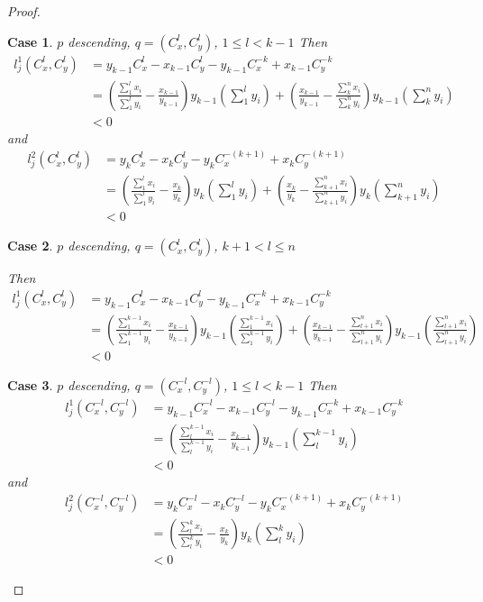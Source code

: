 \documentclass{article}
\theoremstyle{case}
\newtheorem{case}{Case}
\begin{document}
\begin{proof}
%
%
\setcounter{case}{0}
\begin{case} $p$ descending, $q = \left( C_x^l, C_y^l\right)$, $1 \leq l < k-1$
\noindent Then
\begin{align*}
l_j^1\left( C_x^l, C_y^l \right) &= y_{k-1}C_x^l - x_{k-1}C_y^l - y_{k-1}C_x^{-k} + x_{k-1}C_y^{-k} \\
&= \left( \frac{\sum_1^l x_i}{\sum_1^l y_i} - \frac{x_{k-1}}{y_{k-1}}\right)y_{k-1}\left( \sum_1^l y_i\right) + \left( \frac{x_{k-1}}{y_{k-1}} - \frac{\sum_k^n x_i}{\sum_k^n y_i}\right)y_{k-1}\left( \sum_k^n y_i\right) \\
&< 0
\end{align*}
and
\begin{align*}
l_j^2\left( C_x^l, C_y^l\right) &= y_kC_x^l - x_kC_y^l - y_kC_x^{-(k+1)} + x_kC_y^{-(k+1)} \\
&= \left( \frac{\sum_1^l x_i}{\sum_1^l y_i} - \frac{x_k}{y_k}\right)y_k\left( \sum_1^l y_i \right) + \left( \frac{x_k}{y_k} - \frac{\sum_{k+1}^n x_i}{\sum_{k+1}^n y_i}\right)y_k\left( \sum_{k+1}^n y_i\right) \\
&< 0
\end{align*}
\end{case}

%
%
\begin{case} $p$ descending, $q = \left( C_x^l, C_y^l\right)$, $k+1 < l \leq n$

\noindent Then
\begin{align*}
l_j^1\left( C_x^l, C_y^l \right) &= y_{k-1}C_x^l - x_{k-1}C_y^l - y_{k-1}C_x^{-k} + x_{k-1}C_y^{-k} \\
&= \left( \frac{\sum_1^{k-1}x_i}{\sum_1^{k-1}y_i} - \frac{x_{k-1}}{y_{k-1}}\right)y_{k-1}\left( \frac{\sum_1^{k-1}x_i}{\sum_1^{k-1}y_i}\right) + \left( \frac{x_{k-1}}{y_{k-1}} - \frac{\sum_{l+1}^n x_i}{\sum_{l+1}^n y_i}\right)y_{k-1}\left( \frac{\sum_{l+1}^n x_i}{\sum_{l+1}^n y_i}\right) \\
&< 0
\end{align*}
\end{case}

%
%
\begin{case} $p$ descending, $q = \left( C_x^{-l}, C_y^{-l}\right)$, $1 \leq l < k-1$
\noindent Then
\begin{align*}
l_j^1\left( C_x^{-l}, C_y^{-l}\right) &= y_{k-1}C_x^{-l} - x_{k-1}C_y^{-l} - y_{k-1}C_x^{-k} + x_{k-1}C_y^{-k} \\
&= \left( \frac{\sum_l^{k-1}x_i}{\sum_l^{k-1}y_i} - \frac{x_{k-1}}{y_{k-1}}\right)y_{k-1}\left( \sum_l^{k-1}y_i\right) \\
&< 0
\end{align*}
and
\begin{align*}
l_j^2\left(C_x^{-l}, C_y^{-l}\right) &= y_kC_x^{-l} - x_kC_y^{-l} - y_kC_x^{-(k+1)} + x_kC_y^{-(k+1)} \\
&= \left( \frac{\sum_l^k x_i}{\sum_l^k y_i} - \frac{x_k}{y_k}\right)y_k\left( \sum_l^k y_i\right) \\
&< 0
\end{align*}
\end{case}


\end{proof}
\end{document}
